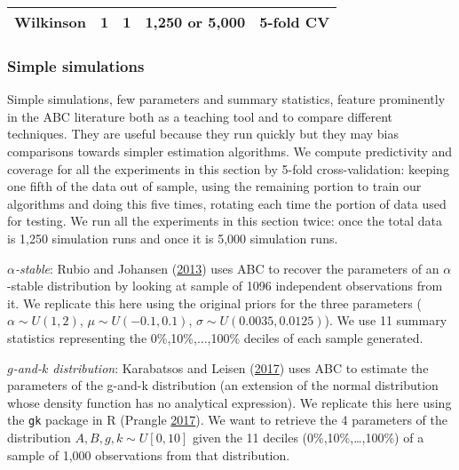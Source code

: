 \documentclass[]{article}
\begin{document}
\begin{longtable}[]{@{}lllll@{}}
\begin{minipage}[t]{0.20\columnwidth}
Wilkinson\strut
\end{minipage} & \begin{minipage}[t]{0.15\columnwidth}\raggedright
1\strut
\end{minipage} & \begin{minipage}[t]{0.21\columnwidth}\raggedright
1\strut
\end{minipage} & \begin{minipage}[t]{0.15\columnwidth}\raggedright
1,250 or 5,000\strut
\end{minipage} & \begin{minipage}[t]{0.15\columnwidth}\raggedright
5-fold CV\strut
\end{minipage}\tabularnewline
\bottomrule
\end{longtable}

\hypertarget{simple-simulations}{%
\subsubsection{Simple simulations}\label{simple-simulations}}

Simple simulations, few parameters and summary statistics, feature prominently in the ABC literature both as a teaching tool and to compare different techniques.
They are useful because they run quickly but they may bias comparisons towards simpler estimation algorithms.
We compute predictivity and coverage for all the experiments in this section by 5-fold cross-validation: keeping one fifth of the data out of sample, using the remaining portion to train our algorithms and doing this five times, rotating each time the portion of data used for testing.
We run all the experiments in this section twice: once the total data is 1,250 simulation runs and once it is 5,000 simulation runs.

\emph{\(\alpha\)-stable}: Rubio and Johansen (\protect\hyperlink{ref-Rubio2013}{2013}) uses ABC to recover the parameters of an \(\alpha\)-stable distribution by looking at sample of 1096 independent observations from it. We replicate this here using the original priors for the three parameters (\(\alpha \sim U(1,2)\), \(\mu \sim U(-0.1,0.1)\), \(\sigma \sim U(0.0035,0.0125)\)). We use 11 summary statistics representing the 0\%,10\%,\(\dots\),100\% deciles of each sample generated.

\emph{\(g\)-and-\(k\) distribution}: Karabatsos and Leisen (\protect\hyperlink{ref-Karabatsos2017}{2017}) uses ABC to estimate the parameters of the g-and-k distribution (an extension of the normal distribution whose density function has no analytical expression). We replicate this here using the \texttt{gk} package in R (Prangle \protect\hyperlink{ref-Prangle2017}{2017}).
We want to retrieve the 4 parameters of the distribution \(A,B,g,k \sim U[0,10]\) given the 11 deciles (0\%,10\%,\ldots,100\%) of a sample of 1,000 observations from that distribution.
\end{document}
